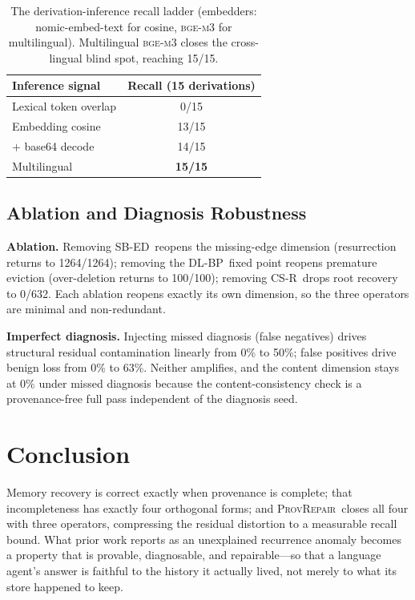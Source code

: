 \documentclass[11pt]{article}
\theoremstyle{remark}
\newcommand{\ours}{\textsc{ProvRepair}}
\newcommand{\sbed}{\textsc{SB-ED}}
\newcommand{\dlbp}{\textsc{DL-BP}}
\newcommand{\csr}{\textsc{CS-R}}
\begin{document}
\begin{table}[t]
\centering
\small
\begin{tabular}{lc}
\toprule
\textbf{Inference signal} & \textbf{Recall (15 derivations)} \\
\midrule
Lexical token overlap & 0/15 \\
Embedding cosine & 13/15 \\
$+$ base64 decode & 14/15 \\
Multilingual & \textbf{15/15} \\
\bottomrule
\end{tabular}
\caption{The derivation-inference recall ladder (embedders: nomic-embed-text for cosine, \textsc{bge-m3} for multilingual). Multilingual \textsc{bge-m3} closes the cross-lingual blind spot, reaching 15/15.}
\label{tab:ladder}
\end{table}

\subsection{Ablation and Diagnosis Robustness}
\label{sec:ablation}

\textbf{Ablation.} Removing \sbed\ reopens the missing-edge dimension (resurrection
returns to 1264/1264); removing the \dlbp\ fixed point reopens premature eviction
(over-deletion returns to 100/100); removing \csr\ drops root recovery to 0/632. Each
ablation reopens exactly its own dimension, so the three operators are minimal and
non-redundant.

\textbf{Imperfect diagnosis.} Injecting missed diagnosis (false negatives) drives
structural residual contamination linearly from 0\% to 50\%; false positives drive
benign loss from 0\% to 63\%. Neither amplifies, and the content dimension stays at
0\% under missed diagnosis because the content-consistency check is a provenance-free
full pass independent of the diagnosis seed.

\section{Conclusion}

Memory recovery is correct exactly when provenance is complete; that incompleteness has
exactly four orthogonal forms; and \ours\ closes all four with three operators,
compressing the residual distortion to a measurable recall bound. What prior work
reports as an unexplained recurrence anomaly becomes a property that is provable,
diagnosable, and repairable---so that a language agent's answer is faithful to the
history it actually lived, not merely to what its store happened to keep.
\end{document}
